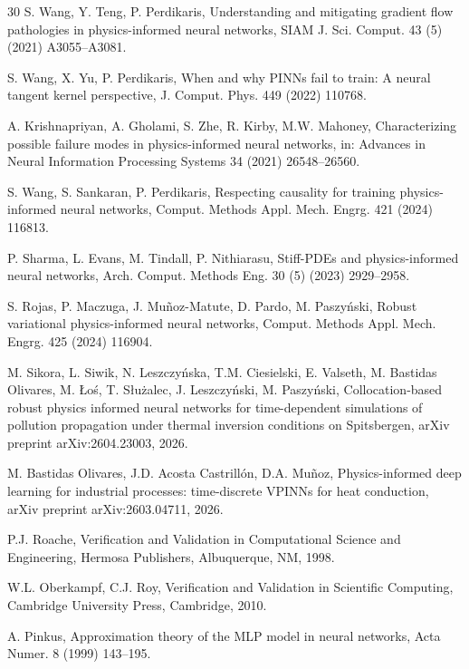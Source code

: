 \documentclass[a4paper,fleqn]{cas-sc}
\begin{document}
\begin{thebibliography}{30}
S. Wang, Y. Teng, P. Perdikaris, Understanding and mitigating gradient flow pathologies in physics-informed neural
networks, SIAM J. Sci. Comput. 43 (5) (2021) A3055--A3081.

S. Wang, X. Yu, P. Perdikaris, When and why PINNs fail to train: A neural tangent kernel perspective, J. Comput. Phys.
449 (2022) 110768.

A. Krishnapriyan, A. Gholami, S. Zhe, R. Kirby, M.W. Mahoney, Characterizing possible failure modes in
physics-informed neural networks, in: Advances in Neural Information Processing Systems 34 (2021) 26548--26560.

S. Wang, S. Sankaran, P. Perdikaris, Respecting causality for training physics-informed neural networks, Comput. Methods
Appl. Mech. Engrg. 421 (2024) 116813.

P. Sharma, L. Evans, M. Tindall, P. Nithiarasu, Stiff-PDEs and physics-informed neural networks, Arch. Comput. Methods
Eng. 30 (5) (2023) 2929--2958.

S. Rojas, P. Maczuga, J. Mu\~noz-Matute, D. Pardo, M. Paszy\'nski, Robust variational physics-informed neural
networks, Comput. Methods Appl. Mech. Engrg. 425 (2024) 116904.

M. Sikora, L. Siwik, N. Leszczy\'nska, T.M. Ciesielski, E. Valseth, M. Bastidas Olivares, M. {\L}o\'s, T.
S{\l}u\.zalec, J. Leszczy\'nski, M. Paszy\'nski, Collocation-based robust physics informed neural networks for
time-dependent simulations of pollution propagation under thermal inversion conditions on Spitsbergen, arXiv preprint
arXiv:2604.23003, 2026.

M. Bastidas Olivares, J.D. Acosta Castrill\'on, D.A. Mu\~noz, Physics-informed deep learning for industrial processes:
time-discrete VPINNs for heat conduction, arXiv preprint arXiv:2603.04711, 2026.

P.J. Roache, Verification and Validation in Computational Science and Engineering, Hermosa Publishers, Albuquerque, NM,
1998.

W.L. Oberkampf, C.J. Roy, Verification and Validation in Scientific Computing, Cambridge University Press, Cambridge,
2010.

A. Pinkus, Approximation theory of the MLP model in neural networks, Acta Numer. 8 (1999) 143--195.


\end{thebibliography}
\end{document}
